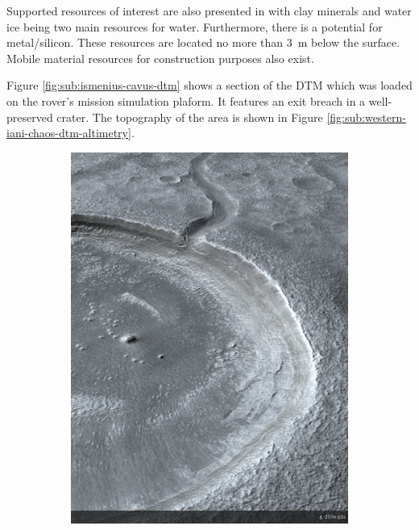 Supported resources of interest are also presented in  with clay minerals and water ice being two main resources for water. Furthermore, there is a potential for metal/silicon. These resources are located no more than \SI{3}{\meter} below the surface. Mobile material resources for construction purposes also exist.

Figure \ref{fig:sub:ismenius-cavus-dtm} shows a section of the \ac{DTM} which was loaded on the rover's mission simulation plaform. It features an exit breach in a well-preserved crater. The topography of the area is shown in Figure \ref{fig:sub:western-iani-chaos-dtm-altimetry}.
\vspace{0.5cm}

\begin{figure}[h]
\captionsetup[subfigure]{justification=centering}
\vspace{-2ex}
	\centering
    \setlength{\subfigureWidth}{0.50\textwidth}
    \setlength{\graphicsHeight}{100mm}
    \hypersetup{hidelinks=true}%
    \begin{subfigure}[t]{\subfigureWidth}
        \centering
        \includegraphics[height=\graphicsHeight]{sections/mars-solar-energy/mission-sites/images/ismenius-cavus-dtm.png}

\end{subfigure}
\end{figure}
